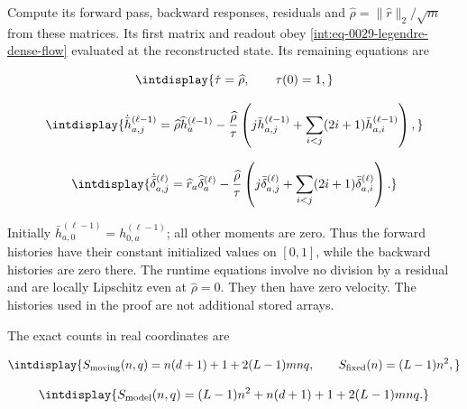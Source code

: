 Compute its forward pass, backward responses, residuals and \(\widehat\rho=\|\widehat r\|_2/\sqrt m\) from these matrices. Its first matrix and readout obey \eqref{int:eq-0029-legendre-dense-flow} evaluated at the reconstructed state. Its remaining equations are


\begingroup\renewcommand{\theHequation}{intdisplay.102}
\begin{equation*}
\intdisplay{
\dot\tau=\widehat\rho,\qquad \tau(0)=1,
}
\end{equation*}
\endgroup

\begingroup\renewcommand{\theHequation}{intdisplay.103}
\begin{equation*}
\intdisplay{
\dot{\bar h}_{a,j}^{(\ell-1)}
=\widehat\rho\widehat h_a^{(\ell-1)}
-\frac{\widehat\rho}{\tau}
\left(j\bar h_{a,j}^{(\ell-1)}
+\sum_{i<j}(2i+1)\bar h_{a,i}^{(\ell-1)}\right),
}
\end{equation*}
\endgroup

\begingroup\renewcommand{\theHequation}{intdisplay.104}
\begin{equation}
\intdisplay{
\dot{\bar\delta}_{a,j}^{(\ell)}
=\widehat r_a\widehat\delta_a^{(\ell)}
-\frac{\widehat\rho}{\tau}
\left(j\bar\delta_{a,j}^{(\ell)}
+\sum_{i<j}(2i+1)\bar\delta_{a,i}^{(\ell)}\right).
}
\label{int:eq-0031-legendre-moment-flow}
\end{equation}
\endgroup


Initially \(\bar h_{a,\allowbreak 0}^{(\ell-1)}=h_{0,\allowbreak a}^{(\ell-1)}\); all other moments are zero. Thus the forward histories have their constant initialized values on \([0,\allowbreak 1]\), while the backward histories are zero there. The runtime equations involve no division by a residual and are locally Lipschitz even at \(\widehat\rho=0\). They then have zero velocity. The histories used in the proof are not additional stored arrays.



The exact counts in real coordinates are


\begingroup\renewcommand{\theHequation}{intdisplay.105}
\begin{equation*}
\intdisplay{
S_{\rm moving}(n,q)=n(d+1)+1+2(L-1)mnq,
\qquad S_{\rm fixed}(n)=(L-1)n^2,
}
\end{equation*}
\endgroup

\begingroup\renewcommand{\theHequation}{intdisplay.106}
\begin{equation}
\intdisplay{
S_{\rm model}(n,q)=(L-1)n^2+n(d+1)+1+2(L-1)mnq.
}
\label{int:eq-0032-legendre-storage}
\end{equation}
\endgroup

